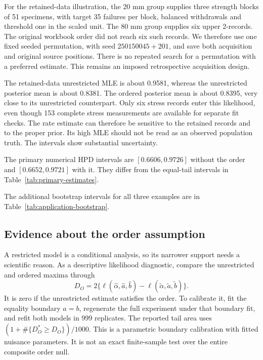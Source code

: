 \FloatBarrier

For the retained-data illustration, the 20 mm group supplies three strength blocks of 51 specimens, with target 35 failures per block, balanced withdrawals and threshold one in the scaled unit. The 80 mm group supplies six upper 2-records. The original workbook order did not reach six such records. We therefore use one fixed seeded permutation, with seed $250150045+201$, and save both acquisition and original source positions. There is no repeated search for a permutation with a preferred estimate. This remains an imposed retrospective acquisition design.



The retained-data unrestricted MLE is about 0.9581, whereas the unrestricted posterior mean is about 0.8381. The ordered posterior mean is about 0.8395, very close to its unrestricted counterpart. Only six stress records enter this likelihood, even though 153 complete stress measurements are available for separate fit checks. The rate estimate can therefore be sensitive to the retained records and to the proper prior. Its high MLE should not be read as an observed population truth. The intervals show substantial uncertainty.

The primary numerical HPD intervals are $[0.6606,0.9726]$ without the order and $[0.6652,0.9721]$ with it. They differ from the equal-tail intervals in Table~\ref{tab:primary-estimates}.

The additional bootstrap intervals for all three examples are in Table~\ref{tab:application-bootstrap}.

\FloatBarrier

\subsection{Evidence about the order assumption}\label{sec:order-diagnostic}
A restricted model is a conditional analysis, so its narrower support needs a scientific reason. As a descriptive likelihood diagnostic, compare the unrestricted and ordered maxima through
\begin{equation}
D_O=2\{\ell(\widehat\alpha,\widehat a,\widehat b)-\ell(\widetilde\alpha,\widetilde a,\widetilde b)\}.\label{eq:order-diagnostic}
\end{equation}
It is zero if the unrestricted estimate satisfies the order. To calibrate it, fit the equality boundary $a=b$, regenerate the full experiment under that boundary fit, and refit both models in 999 replicates. The reported tail area uses $(1+\#\{D_O^*\ge D_O\})/1000$. This is a parametric boundary calibration with fitted nuisance parameters. It is not an exact finite-sample test over the entire composite order null.

